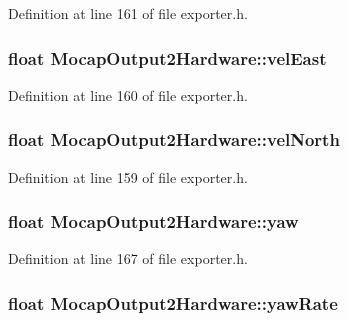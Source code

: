 \-Definition at line 161 of file exporter.\-h.

\hypertarget{group___mo_cap_plugin_gaa2d1409fe871a4dd45265e2412d53f67}{
\subsubsection[{vel\-East}]{\setlength{\rightskip}{0pt plus 5cm}float {\bf \-Mocap\-Output2\-Hardware\-::vel\-East}}}\label{group___mo_cap_plugin_gaa2d1409fe871a4dd45265e2412d53f67}


\-Definition at line 160 of file exporter.\-h.

\hypertarget{group___mo_cap_plugin_gadfa715081f6bc74af7efc32c39d720f2}{
\subsubsection[{vel\-North}]{\setlength{\rightskip}{0pt plus 5cm}float {\bf \-Mocap\-Output2\-Hardware\-::vel\-North}}}\label{group___mo_cap_plugin_gadfa715081f6bc74af7efc32c39d720f2}


\-Definition at line 159 of file exporter.\-h.

\hypertarget{group___mo_cap_plugin_ga423b4c125aa4c8caf1001d16de1dd3f9}{
\subsubsection[{yaw}]{\setlength{\rightskip}{0pt plus 5cm}float {\bf \-Mocap\-Output2\-Hardware\-::yaw}}}\label{group___mo_cap_plugin_ga423b4c125aa4c8caf1001d16de1dd3f9}


\-Definition at line 167 of file exporter.\-h.

\hypertarget{group___mo_cap_plugin_gaddfb563223971f02a45ebd14034b2a06}{
\subsubsection[{yaw\-Rate}]{\setlength{\rightskip}{0pt plus 5cm}float {\bf \-Mocap\-Output2\-Hardware\-::yaw\-Rate}}}\label{group___mo_cap_plugin_gaddfb563223971f02a45ebd14034b2a06}


